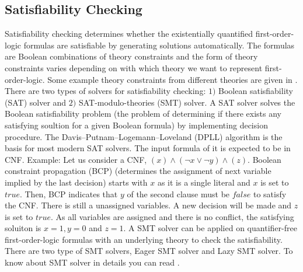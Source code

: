 \subsection{Satisfiability Checking}
Satisfiability checking determines whether the existentially quantified first-order-logic formulas are satisfiable by generating solutions automatically. The formulas are Boolean combinations of theory constraints and the form of theory constraints varies depending on with which theory we want to represent first-order-logic. Some example theory constraints from different theories are given in \cite{erika}. There are two types of solvers for satisfiability checking: $1)$ Boolean satisfiability (SAT) solver and $2)$ SAT-modulo-theories (SMT) solver.\newline
A SAT solver solves the Boolean satisfiability problem (the problem of determining if there exists any satisfying soultion for a given Boolean formula) by implementing decision procedure. The Davis–Putnam–Logemann–Loveland (DPLL) algorithm is the basis for most modern SAT solvers. The input formula of it is expected to be in CNF.\newline
Example: Let us consider a CNF, $(x) \wedge (\neg x\vee\neg y) \wedge (z)$. Boolean constraint propagation (BCP) (determines the assignment of next variable implied by the last decision) starts with $x$ as it is a single literal and $x$ is set to $true$. Then, BCP indicates that  $y$ of the second clause must be $false$ to satisfy the CNF. There is still a unassigned variables. A new decision will be made and $z$ is set to $true$. As all variables are assigned and there is no conflict, the satisfying soluiton is $x=1, y=0$ and $z=1$.\newline
A SMT solver can be applied on quantifier-free first-order-logic formulas with an underlying theory to check the satisfiability. There are two type of SMT solvers, Eager SMT solver and Lazy SMT solver. To know about SMT solver in details you can read \cite{kremer}.
